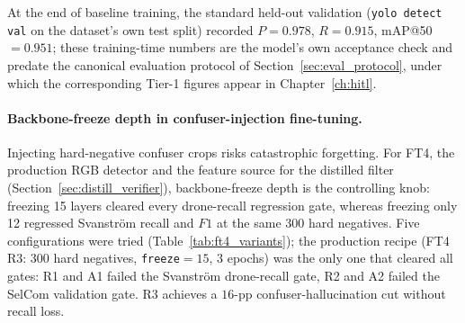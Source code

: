 At the end of baseline training, the standard held-out validation (\texttt{yolo detect val} on the dataset's own test split) recorded $P=0.978$, $R=0.915$, mAP@50 $=0.951$; these training-time numbers are the model's own acceptance check and predate the canonical evaluation protocol of Section~\ref{sec:eval_protocol}, under which the corresponding Tier-1 figures appear in Chapter~\ref{ch:hitl}.

\paragraph{Backbone-freeze depth in confuser-injection fine-tuning.}
Injecting hard-negative confuser crops risks catastrophic forgetting. For FT4, the production RGB detector and the feature source for the distilled filter (Section~\ref{sec:distill_verifier}), backbone-freeze depth is the controlling knob: freezing 15 layers cleared every drone-recall regression gate, whereas freezing only 12 regressed Svanstr\"om recall and $F1$ at the same $300$ hard negatives. Five configurations were tried (Table~\ref{tab:ft4_variants}); the production recipe (FT4 R3: $300$ hard negatives, \texttt{freeze}$=15$, $3$ epochs) was the only one that cleared all gates: R1 and A1 failed the Svanstr\"om drone-recall gate, R2 and A2 failed the SelCom validation gate. R3 achieves a $16$-pp confuser-hallucination cut without recall loss.

\begin{table}[htbp]
    \centering
    \caption{The FT4 confuser-injection recipe grid. Gates: Svanstr\"om drone recall must not regress materially, and SelCom validation $F1$ must not drop. Only R3 passes both.}
    \label{tab:ft4_variants}
\end{table}

